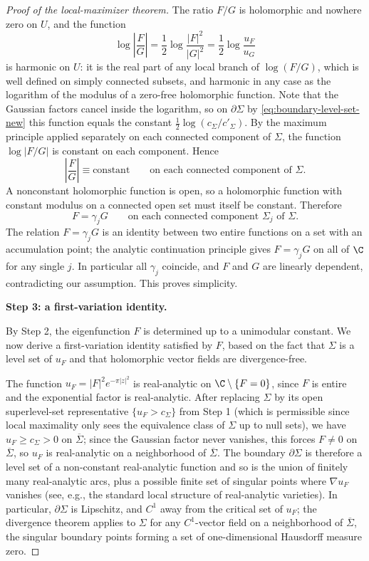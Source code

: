 \begin{proof}[Proof of the local-maximizer theorem]
The ratio \(F/G\) is holomorphic and nowhere zero on \(U\), and the function
\[
\log \left|\frac{F}{G}\right|
=
\frac12 \log \frac{|F|^2}{|G|^2}
=
\frac12 \log \frac{u_F}{u_G}
\]
is harmonic on \(U\): it is the real part of any local branch of
\(\log(F/G)\), which is well defined on simply connected subsets, and harmonic
in any case as the logarithm of the modulus of a zero-free holomorphic
function. Note that the Gaussian factors cancel inside the logarithm, so on
\(\partial \Sigma\) by \eqref{eq:boundary-level-set-new} this function equals
the constant \(\frac12\log(c_\Sigma/c'_\Sigma)\). By the maximum principle
applied separately on each connected component of \(\Sigma\), the function
\(\log|F/G|\) is constant on each component. Hence
\[
\left|\frac{F}{G}\right| \equiv \text{constant}
\qquad \text{on each connected component of } \Sigma.
\]
A nonconstant holomorphic function is open, so a holomorphic function with
constant modulus on a connected open set must itself be constant. Therefore
\[
F=\gamma_j G
\qquad \text{on each connected component } \Sigma_j\text{ of } \Sigma.
\]
The relation \(F=\gamma_j G\) is an identity between two entire functions on a
set with an accumulation point; the analytic continuation principle gives
\(F=\gamma_j G\) on all of \(\C\) for any single \(j\). In particular all
\(\gamma_j\) coincide, and \(F\) and \(G\) are linearly dependent, contradicting
our assumption. This proves simplicity.

\medskip
\noindent
{\bf Step 3: a first-variation identity.}

By Step 2, the eigenfunction \(F\) is determined up to a unimodular constant.
We now derive a first-variation identity satisfied by \(F\), based on the fact
that \(\Sigma\) is a level set of \(u_F\) and that holomorphic vector fields are
divergence-free.

The function \(u_F=|F|^2e^{-\pi|z|^2}\) is real-analytic on
\(\C\setminus\{F=0\}\), since \(F\) is entire and the exponential factor is
real-analytic. After replacing \(\Sigma\) by its open superlevel-set
representative \(\{u_F>c_\Sigma\}\) from Step 1 (which is permissible since
local maximality only sees the equivalence class of \(\Sigma\) up to null
sets), we have \(u_F\ge c_\Sigma>0\) on \(\overline\Sigma\); since the
Gaussian factor never vanishes, this forces \(F\ne 0\) on
\(\overline\Sigma\), so \(u_F\) is real-analytic on a neighborhood of
\(\overline\Sigma\). The boundary \(\partial\Sigma\) is therefore a level set
of a non-constant real-analytic function and so is the union of finitely many
real-analytic arcs, plus a possible finite set of singular points where
\(\nabla u_F\) vanishes (see, e.g., the standard local structure of
real-analytic varieties). In particular, \(\partial\Sigma\) is Lipschitz, and
\(C^1\) away from the critical set of \(u_F\); the divergence theorem applies
to \(\Sigma\) for any \(C^1\)-vector field on a neighborhood of
\(\overline\Sigma\), the singular boundary points forming a set of
one-dimensional Hausdorff measure zero.


\end{proof}
